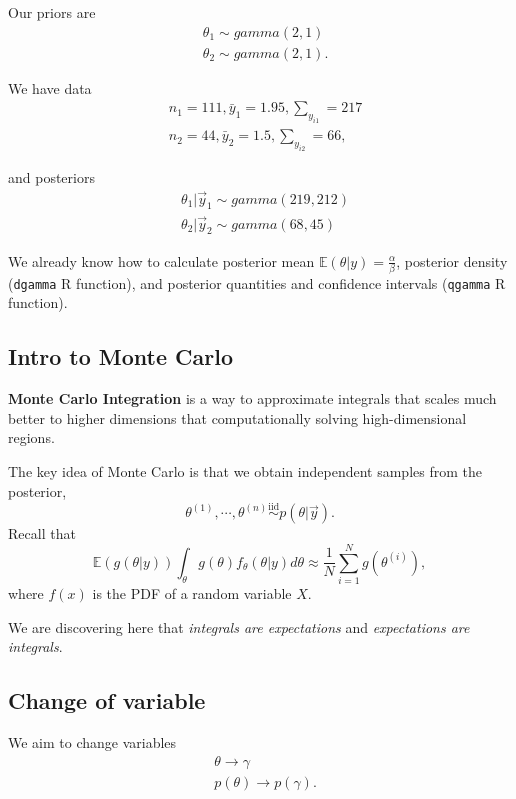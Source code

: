 \documentclass[titlepage, 12pt, leqno]{article}
\begin{document}
Our priors are
\begin{align*}
    &\theta_{1} \sim gamma(2,1) \\
    &\theta_{2} \sim gamma(2,1).
\end{align*}

We have data
\begin{align*}
    &n_{1}=111, \bar y_{1}=1.95, \sum_{y_{i1}}=217 \\
    &n_{2}=44, \bar y_{2}=1.5, \sum_{y_{i2}}=66,
\end{align*}

and posteriors
\begin{align*}
    &\theta_{1}|\vec y_{1} \sim gamma(219,212) \\
    &\theta_{2}|\vec y_{2} \sim gamma(68,45)
\end{align*}

We already know how to calculate posterior mean $ \mathbb{E}(\theta|y) = 
\frac{\alpha}{\beta}$, posterior density (\texttt{dgamma} R function), and 
posterior quantities and confidence intervals (\texttt{qgamma} R function).

\subsection{Intro to Monte Carlo}
\begin{definition}
    \textbf{Monte Carlo Integration} is a way to approximate integrals that scales
    much better to higher dimensions that computationally solving 
    high-dimensional regions.
\end{definition}
 
The key idea of Monte Carlo is that we obtain independent samples from the
posterior,
\[
\theta^{(1)}, \cdots , \theta^{(n)} \overset{\mathrm{iid}}{\sim} p(\theta|\vec y).
\]
Recall that 
\[
\mathbb{E}(g(\theta|y)) \int_{\theta}g(\theta)f_{\theta}(\theta|y)d \theta
\approx \frac{1}{N}\sum_{i=1}^{N}g(\theta^{(i)}),
\]
where $f(x)$ is the PDF of a random variable $X$.

\begin{note}
    We are discovering here that \textit{integrals are expectations} and 
    \textit{expectations are integrals}.
\end{note}

\subsection{Change of variable}

We aim to change variables
\begin{align*}
    &\theta \rightarrow \gamma \\
    & p(\theta) \rightarrow p(\gamma).
\end{align*}
\end{document}
